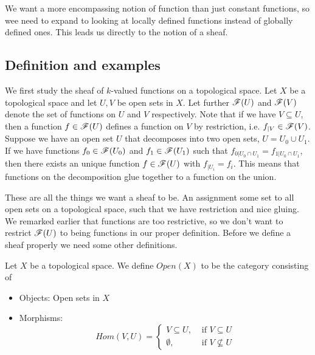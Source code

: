 We want a more encompassing notion of function than just constant functions, so wee need to expand to looking at locally defined functions instead of globally defined ones. This leads us directly to the notion of a sheaf. 

\subsection{Definition and examples}

We first study the sheaf of $k$-valued functions on a topological space. Let $X$ be a topological space and let $U, V$ be open sets in $X$. Let further $\mathscr{F}(U)$ and $\mathscr{F}(V)$ denote the set of functions on $U$ and $V$ respectively. Note that if we have $V\subseteq U$, then a function $f\in \mathscr{F}(U)$ defines a function on $V$ by restriction, i.e. $f_{\vert V}\in \mathscr{F}(V)$. Suppose we have an open set $U$ that decomposes into two open sets, $U=U_0\cup U_1$. If we have functions $f_0\in \mathscr{F}(U_0)$ and $f_1\in \mathscr{F}(U_1)$ such that $f_{0\vert U_0\cap U_1}=f_{1\vert U_0\cap U_1}$, then there exists an unique function $f\in \mathscr{F}(U)$ with $f_{\vert U_i}=f_i$. This means that functions on the decomposition glue together to a function on the union. 

These are all the things we want a sheaf to be. An assignment some set to all open sets on a topological space, such that we have restriction and nice gluing. We remarked earlier that functions are too restrictive, so we don't want to restrict $\mathscr{F}(U)$ to being functions in our proper definition. Before we define a sheaf properly we need some other definitions. 

\begin{definition}
Let $X$ be a topological space. We define $Open(X)$ to be the category consisting of 
\begin{itemize}
    \item Objects: Open sets in $X$
    \item Morphisms:
    \begin{equation*}
        Hom(V, U) = 
        \begin{cases}
            V\subseteq U, & \text{ if } V\subseteq U \\
            \emptyset, & \text{ if } V\nsubseteq U
        \end{cases}
    \end{equation*}
\end{itemize}
\end{definition}



